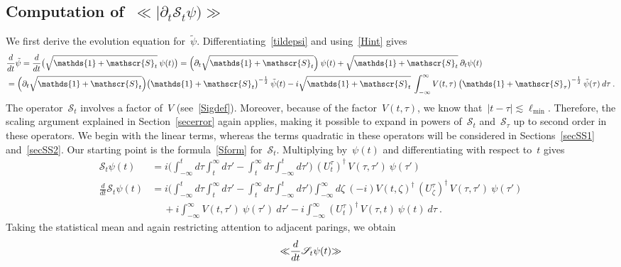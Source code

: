 \documentclass[reqno,11pt]{amsart}
\numberwithin{equation}{section}
\newcommand{\bbra}{\mathopen{\ll}}
\newcommand{\kket}{\mathclose{\gg}}
\newcommand{\1}{\mathds{1}}
\newcommand{\Sig}{\mathscr{S}}
\begin{document}
{\subsection{Computation of~$\bbra |\partial_t \Sig_t \psi) \kket$}
We first derive the evolution equation for~$\tilde{\psi}$. Differentiating~\eqref{tildepsi} 
and using~\eqref{Hint} gives
\begin{align}
&\frac{d}{dt} \tilde{\psi} = \frac{d}{dt} \big( \sqrt{\1+\Sig_{t}} \:\psi(t) \big)
= \Big( \partial_t \sqrt{\1+\Sig_{t}} \Big)\:\psi(t) + \sqrt{\1+\Sig_{t}} \:\partial_t \psi(t) \notag \\
&= \Big( \partial_t \sqrt{\1+\Sig_{t}} \Big) \big( \1+\Sig_{t} \big)^{-\frac{1}{2}}\: \tilde{\psi}(t)
-i  \sqrt{\1+\Sig_{t}}\: \int_{-\infty}^\infty V(t,\tau)\: \big( \1+\Sig_\tau \big)^{-\frac{1}{2}}\: \tilde{\psi}(\tau)\: d\tau \:.
\label{Sigexpand}
\end{align}
The operator~$\Sig_t$ involves a factor of~$V$ (see~\eqref{Sigdef}). Moreover, because of the
factor~$V(t,\tau)$, we know that~$|t-\tau| \lesssim \ell_{\min}$.
Therefore, the scaling argument explained in Section~\ref{secerror} again applies,
making it possible to expand in powers of~$\Sig_t$ and~$\Sig_\tau$ up to second order in
these operators. We begin with the linear terms, whereas the terms quadratic in these operators
will be considered in Sections~\ref{secSS1} and~\ref{secSS2}.
Our starting point is the formula~\eqref{Sform} for~$\Sig_t$. Multiplying by~$\psi(t)$ and differentiating
with respect to~$t$ gives
\begin{align*}
\Sig_t \psi(t) &=  i \bigg( \int_{-\infty}^t \!\!\!\!\!d\tau \int_t^\infty \!\!\!\!\!d\tau' \!-\! \int_t^\infty \!\!\!\!\!d\tau \int_{-\infty}^t \!\!\!\!\!d\tau' \bigg) \: (U^\tau_t)^\dagger \,V(\tau,\tau') \:\psi(\tau') \\
\frac{d}{dt} \Sig_t \psi(t) &=
i \bigg( \int_{-\infty}^t \!\!\!\!\!d\tau \int_t^\infty \!\!\!\!\!d\tau' \!-\! \int_t^\infty \!\!\!\!\!d\tau \int_{-\infty}^t \!\!\!\!\!d\tau' \bigg) 
\int_{-\infty}^\infty d\zeta \:(-i) V(t, \zeta)^\dagger \,(U^\tau_\zeta)^\dagger\, V(\tau,\tau') \:\psi(\tau') \\
&\quad\: + i \int_{-\infty}^\infty V(t,\tau') \:\psi(\tau')\: d\tau' - i \int_{-\infty}^\infty (U^\tau_t)^\dagger \,V(\tau,t)
\:\psi(t)\: d\tau \:.
\end{align*}
Taking the statistical mean and again restricting attention to adjacent parings, we obtain
\begin{align}
&\bbra \frac{d}{dt} \Sig_t \psi(t) \kket \notag \\

\end{align}}
\end{document}
